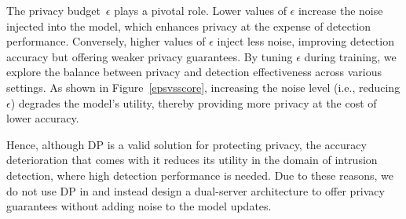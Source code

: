 The privacy budget~$\epsilon$ plays a pivotal role. Lower values of $\epsilon$ increase the noise injected into the model, which enhances privacy at the expense of detection performance. Conversely, higher values of $\epsilon$ inject less noise, improving detection accuracy but offering weaker privacy guarantees. By tuning $\epsilon$ during training, we explore the balance between privacy and detection effectiveness across various settings. As shown in Figure~\ref{epsvsscore}, increasing the noise level (i.e., reducing $\epsilon$) degrades the model’s utility, thereby providing more privacy at the cost of lower accuracy.

Hence, although DP is a valid solution for protecting privacy, the accuracy deterioration that comes with it reduces its utility in the domain of intrusion detection, where high detection performance is needed. Due to these reasons, we do not use DP in \Sys and instead design a dual-server architecture to offer privacy guarantees without adding noise to the model updates.
